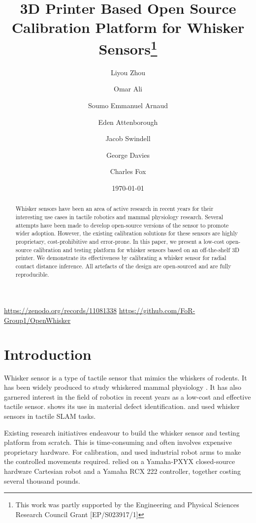\documentclass[runningheads]{llncs}
\title{3D Printer Based Open Source Calibration Platform for Whisker Sensors\thanks{This work was partly supported by the Engineering and Physical Sciences
Research Council Grant [EP/S023917/1]}}
\author{
    Liyou Zhou\orcidID{0009-0005-9491-9003} \and
    Omar Ali \orcidID{0009-0009-3523-6084} \and
    Soumo Emmanuel Arnaud \and
    Eden Attenborough \and
    Jacob Swindell \and
    George Davies \and
    Charles Fox
}
\institute{School of Computer Science, University of Lincoln, Lincoln, UK}
\date{\today}
\begin{document}
\maketitle

\vspace{-10pt}

\begin{center}
    \url{https://zenodo.org/records/11081338}
    \url{https://github.com/FoR-Group1/OpenWhisker}
\end{center}

\begin{abstract}
\vspace{-5pt}
Whisker sensors have been an area of active research in recent years for their interesting use cases in tactile robotics and mammal physiology research. Several attempts have been made to develop open-source versions of the sensor to promote wider adoption. However, the existing calibration solutions for these sensors are highly proprietary, cost-prohibitive and error-prone. In this paper, we present a low-cost open-source calibration and testing platform for whisker sensors based on an off-the-shelf 3D printer. We demonstrate its effectiveness by calibrating a whisker sensor for radial contact distance inference. All artefacts of the design are open-sourced and are fully reproducible.
\vspace{-5pt}
\end{abstract}

\section{Introduction}

Whisker sensor is a type of tactile sensor that mimics the whiskers of rodents. It has been widely produced to study whiskered mammal physiology \cite{prescottActiveTouchSensing2020}. It has also garnered interest in the field of robotics in recent years as a low-cost and effective tactile sensor. \cite{fotouhiDetectionBarelyVisible2021} shows its use in material defect identification. \cite{struckmeierViTaSLAMBioinspiredVisuoTactile2019} and \cite{foxTactileSLAMBiomimetic2012} used whisker sensors in tactile SLAM tasks.

Existing research initiatives endeavour to build the whisker sensor and testing platform from scratch. This is time-consuming and often involves expensive proprietary hardware. For calibration, \cite{sullivanTactileDiscriminationUsing2012} and \cite{fotouhiDetectionBarelyVisible2021} used industrial robot arms to make the controlled movements required. \cite{evansWhiskerobjectContactSpeed2010} relied on a Yamaha-PXYX closed-source hardware Cartesian robot and a Yamaha RCX 222 controller, together costing several thousand pounds.
\end{document}
